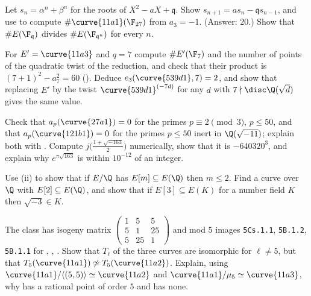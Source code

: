 \begin{exercise}\label{ex:ellcurves:ex-Fqn}
Let $s_n=\alpha^n+\beta^n$ for the roots of $X^2-aX+\mathfrak q$. Show $s_{n+1}=as_n-\mathfrak qs_{n-1}$, and use  to compute $\#\curve{11a1}(\F_{27})$ from $a_3=-1$. (Answer: $20$.)
Show that $\#E(\F_{\mathfrak q})$ divides $\#E(\F_{\mathfrak q^n})$ for every $n$.
\end{exercise}

\begin{exercise}\label{ex:ellcurves:ex-I0star}
For $E'=\curve{11a3}$ and $q=7$ compute $\#E'(\F_7)$ and the number of points of the quadratic twist of the reduction, and check that their product is $(7+1)^2-a_7^2=60$
(). Deduce $e_3(\curve{539d1},7)=2$, and show that replacing $E'$ by the twist $\curve{539d1}^{(-7d)}$ for any $d$ with $7\nmid\disc\Q(\sqrt d)$ gives the same value.
\end{exercise}

\begin{exercise}\label{ex:ellcurves:ex-cm}
Check that $a_p(\curve{27a1})=0$ for the primes $p\equiv2\pmod3$, $p\le50$, and that $a_p(\curve{121b1})=0$ for the primes $p\le50$ inert in $\Q(\sqrt{-11})$; explain both with
. Compute $j\bigl(\frac{1+\sqrt{-163}}2\bigr)$ numerically, show that it is $-640320^3$, and explain why $e^{\pi\sqrt{163}}$ is within $10^{-12}$ of an integer.
\end{exercise}

\begin{exercise}\label{ex:ellcurves:ex-fulltorsion}
Use (ii) to show that if $E/\Q$ has $E[m]\subseteq E(\Q)$ then $m\le2$. Find a curve over $\Q$ with $E[2]\subseteq E(\Q)$, and show that if $E[3]\subseteq E(K)$ for a number field $K$ then
$\sqrt{-3}\in K$.
\end{exercise}

\begin{exercise}\label{ex:ellcurves:ex-11a}
The class  has isogeny matrix $\left(\begin{smallmatrix}1&5&5\\5&1&25\\5&25&1\end{smallmatrix}\right)$ and mod $5$ images \texttt{5Cs.1.1}, \texttt{5B.1.2}, \texttt{5B.1.1} for ,
, . Show that $T_\ell$ of the three curves are isomorphic for $\ell\ne5$, but that $T_5(\curve{11a1})\not\simeq T_5(\curve{11a2})$. Explain, using
$\curve{11a1}/\langle(5,5)\rangle\simeq\curve{11a2}$ and $\curve{11a1}/\mu_5\simeq\curve{11a3}$, why  has a rational point of order $5$ and  has none.
\end{exercise}

